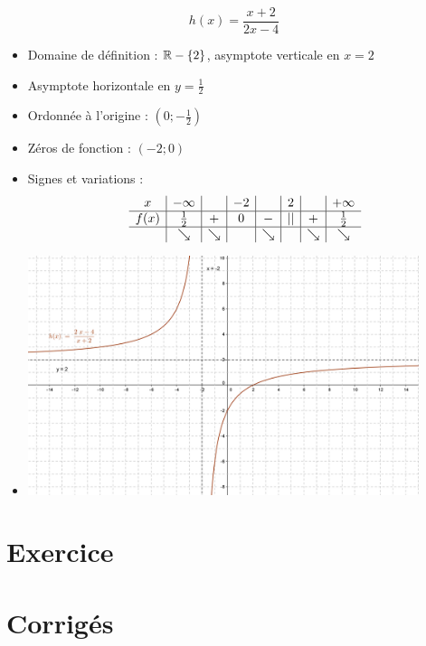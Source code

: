 \begin{exemple}
$$h(x) = \frac{x+2}{2x-4}$$
			\begin{itemize}
				\item Domaine de définition : $\mathbb{R}-\{2\}$, asymptote verticale en $x=2$
				\item Asymptote horizontale en $y=\frac{1}{2}$
				\item Ordonnée à l'origine : $(0;-\frac{1}{2})$
				\item Zéros de fonction : $(-2;0)$
				\item Signes et variations :
				$$
				\begin{array}{c|c|c|c|c|c|c|c}
				x&-\infty & & -2 & & 2 & &  +\infty\\
				\hline
				f(x)& \frac{1}{2} & + & 0 & - & || & + &\frac{1}{2}\\
				\hline
				& \searrow & \searrow & &\searrow & & \searrow & \searrow
				\end{array}
				$$
				\item 
				\begin{center}
				\includegraphics[width = 0.9\textwidth]{quadratique/homographique.png}
				\end{center}
			\end{itemize}
\end{exemple}

\section{Exercice}



\section{Corrigés}


